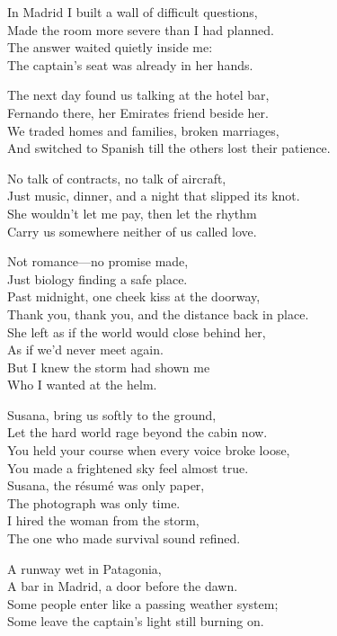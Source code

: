 \begin{lyrics}
In Madrid I built a wall of difficult questions,\\
Made the room more severe than I had planned.\\
The answer waited quietly inside me:\\
The captain’s seat was already in her hands.

The next day found us talking at the hotel bar,\\
Fernando there, her Emirates friend beside her.\\
We traded homes and families, broken marriages,\\
And switched to Spanish till the others lost their patience.

No talk of contracts, no talk of aircraft,\\
Just music, dinner, and a night that slipped its knot.\\
She wouldn’t let me pay, then let the rhythm\\
Carry us somewhere neither of us called love.

Not romance—no promise made,\\
Just biology finding a safe place.\\
Past midnight, one cheek kiss at the doorway,\\
Thank you, thank you, and the distance back in place.\\
She left as if the world would close behind her,\\
As if we’d never meet again.\\
But I knew the storm had shown me\\
Who I wanted at the helm.

Susana, bring us softly to the ground,\\
Let the hard world rage beyond the cabin now.\\
You held your course when every voice broke loose,\\
You made a frightened sky feel almost true.\\
Susana, the résumé was only paper,\\
The photograph was only time.\\
I hired the woman from the storm,\\
The one who made survival sound refined.

A runway wet in Patagonia,\\
A bar in Madrid, a door before the dawn.\\
Some people enter like a passing weather system;\\
Some leave the captain’s light still burning on.
\end{lyrics}
